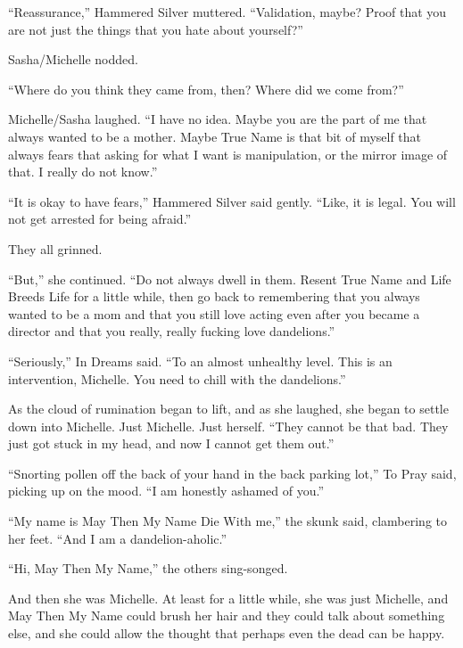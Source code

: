 ``Reassurance,'' Hammered Silver muttered. ``Validation, maybe? Proof that you are not just the things that you hate about yourself?''

Sasha/Michelle nodded.

``Where do you think they came from, then? Where did we come from?''

Michelle/Sasha laughed. ``I have no idea. Maybe you are the part of me that always wanted to be a mother. Maybe True Name is that bit of myself that always fears that asking for what I want is manipulation, or the mirror image of that. I really do not know.''

``It is okay to have fears,'' Hammered Silver said gently. ``Like, it is legal. You will not get arrested for being afraid.''

They all grinned.

``But,'' she continued. ``Do not always dwell in them. Resent True Name and Life Breeds Life for a little while, then go back to remembering that you always wanted to be a mom and that you still love acting even after you became a director and that you really, really fucking love dandelions.''

``Seriously,'' In Dreams said. ``To an almost unhealthy level. This is an intervention, Michelle. You need to chill with the dandelions.''

As the cloud of rumination began to lift, and as she laughed, she began to settle down into Michelle. Just Michelle. Just herself. ``They cannot be that bad. They just got stuck in my head, and now I cannot get them out.''

``Snorting pollen off the back of your hand in the back parking lot,'' To Pray said, picking up on the mood. ``I am honestly ashamed of you.''

``My name is May Then My Name Die With me,'' the skunk said, clambering to her feet. ``And I am a dandelion-aholic.''

``Hi, May Then My Name,'' the others sing-songed.

And then she was Michelle. At least for a little while, she was just Michelle, and May Then My Name could brush her hair and they could talk about something else, and she could allow the thought that perhaps even the dead can be happy.
